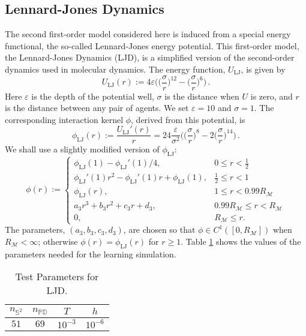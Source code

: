 \documentclass[11pt]{article}
\newcommand{\mM}{\mathcal{M}}
\newcommand{\IR}{R_{\mM}}
\newcommand{\intkernel}{\phi}
\begin{document}
\subsection{Lennard-Jones Dynamics}
%
The second first-order model considered here is induced from a special energy functional, the so-called Lennard-Jones energy potential.  This first-order model, the Lennard-Jones Dynamics (LJD), is a simplified version of the second-order dynamics used in molecular dynamics.  The energy function, $U_{\text{LJ}}$, is given by
\[
U_{\text{LJ}}(r) := 4\varepsilon\Big( \Big(\frac{\sigma}{r}\Big)^{12} - \Big(\frac{\sigma}{r}\Big)^6 \Big)\,.
\]
Here $\varepsilon$ is the depth of the potential well, $\sigma$ is the distance when $U$ is zero, and $r$ is the distance between any pair of agents.  We set $\varepsilon = 10$ and $\sigma = 1$.  The corresponding interaction kernel $\phi$, derived from this potential, is
\[
\intkernel_{\text{LJ}}(r) := \frac{U_{\text{LJ}}'(r)}{r} = 24\frac{\varepsilon}{\sigma^2}\Big(\Big(\frac{\sigma}{r}\Big)^8 - 2\Big(\frac{\sigma}{r}\Big)^{14}\Big)\,.
\]
We shall use a slightly modified version of $\intkernel_{\text{LJ}}$:
\[
\intkernel(r) := \left\{
        \begin{array}{ll}
            \intkernel_{\text{LJ}}(1) - \intkernel_{\text{LJ}}'(1)/4,                                & 0           \le r < \frac{1}{2} \\
            \intkernel_{\text{LJ}}'(1)r^2 - \intkernel_{\text{LJ}}'(1)r + \intkernel_{\text{LJ}}(1), & \frac{1}{2} \le r < 1 \\
            \intkernel_{\text{LJ}}(r),                                                               & 1           \le r < 0.99\IR \\
            a_3r^3 + b_3r^2 + c_3r + d_3,                                                            & 0.99\IR     \le r < \IR \\
            0,                                                                                       & \IR         \le r.
        \end{array}
    \right.
\]
The parameters, $(a_3, b_3, c_3, d_3)$, are chosen so that $\intkernel \in C^1([0, \IR])$ when $\IR < \infty$; otherwise $\intkernel(r) = \intkernel_{\text{LJ}}(r)$ for $r \ge 1$.  Table \ref{tab:LJD_params} shows the values of the parameters needed for the learning simulation.
\begin{table}[H]
\centering
\small{
\small{\begin{tabular}{ c | c | c | c }
$n_{\mathbb{S}^2}$ & $n_{\mathbb{PD}}$ & $T$       & $h$ \\
\hline
$51$      & $69$            & $10^{-3}$ & $10^{-6}$ \\
\end{tabular}}  
}
\caption{Test Parameters for LJD.}
\label{tab:LJD_params} 
\end{table}
\end{document}
